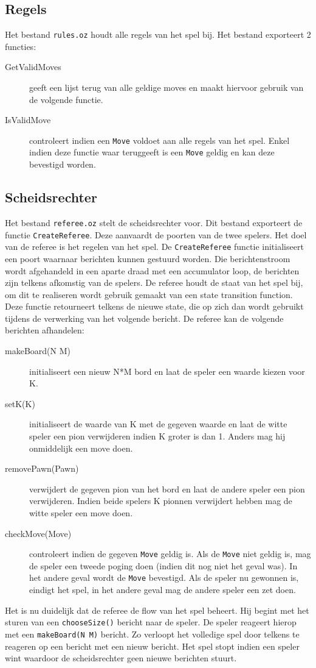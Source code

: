 \documentclass{article}
\begin{document}
\subsection{Regels}
Het bestand \texttt{rules.oz} houdt alle regels van het spel bij. Het bestand exporteert 2 functies: 
\begin{description}
	\item[GetValidMoves] geeft een lijst terug van alle geldige moves en maakt hiervoor gebruik van de volgende functie. 
	\item[IsValidMove] controleert indien een \texttt{Move} voldoet aan alle regels van het spel. Enkel indien deze functie waar teruggeeft is een \texttt{Move} geldig en kan deze bevestigd worden. 
\end{description}
\subsection{Scheidsrechter}
	Het bestand \texttt{referee.oz} stelt de scheidsrechter voor. Dit bestand exporteert de functie \texttt{CreateReferee}. Deze aanvaardt de poorten van de twee spelers. Het doel van de referee is het regelen van het spel. De \texttt{CreateReferee} functie initialiseert een poort waarnaar berichten kunnen gestuurd worden. Die berichtenstroom wordt afgehandeld in een aparte draad met een accumulator loop, de berichten zijn telkens afkomstig van de spelers. De referee houdt de staat van het spel bij, om dit te realiseren wordt gebruik gemaakt van een state transition function. Deze functie retourneert telkens de nieuwe state, die op zich dan wordt gebruikt tijdens de verwerking van het volgende bericht.
	De referee kan de volgende berichten afhandelen: 
	\begin{description}
		\item[makeBoard(N M)] initialiseert een nieuw N*M bord en laat de speler een waarde kiezen voor K. 
		\item[setK(K)] initialiseert de waarde van K met de gegeven waarde en laat de witte speler een pion verwijderen indien K groter is dan 1. Anders mag hij onmiddelijk een move doen. 
		\item[removePawn(Pawn)] verwijdert de gegeven pion van het bord en laat de andere speler een pion verwijderen. Indien beide spelers K pionnen verwijdert hebben mag de witte speler een move doen. 
		\item[checkMove(Move)] controleert indien de gegeven \texttt{Move} geldig is. Als de \texttt{Move} niet geldig is, mag de speler een tweede poging doen (indien dit nog niet het geval was). In het andere geval wordt de \texttt{Move} bevestigd. Als de speler nu gewonnen is, eindigt het spel, in het andere geval mag de andere speler een zet doen. 
	\end{description} 
	Het is nu duidelijk dat de referee de flow van het spel beheert. Hij begint met het sturen van een \texttt{chooseSize()} bericht naar de speler. De speler reageert hierop met een \texttt{makeBoard(N M)} bericht. Zo verloopt het volledige spel door telkens te reageren op een bericht met een nieuw bericht. Het spel stopt indien een speler wint waardoor de scheidsrechter geen nieuwe berichten stuurt.
\end{document}
